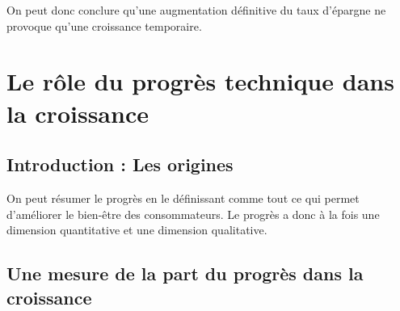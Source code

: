 \documentclass[10pt]{book}
\begin{document}
On peut donc conclure qu'une augmentation définitive du taux d'épargne ne provoque qu'une croissance temporaire.

\chapter{Le rôle du progrès technique dans la croissance}
\section{Introduction : Les origines}
On peut résumer le progrès en le définissant comme tout ce qui permet d'améliorer le bien-être des consommateurs. Le progrès a donc à la fois une dimension quantitative et une dimension qualitative.
\section{Une mesure de la part du progrès dans la croissance}
\end{document}
